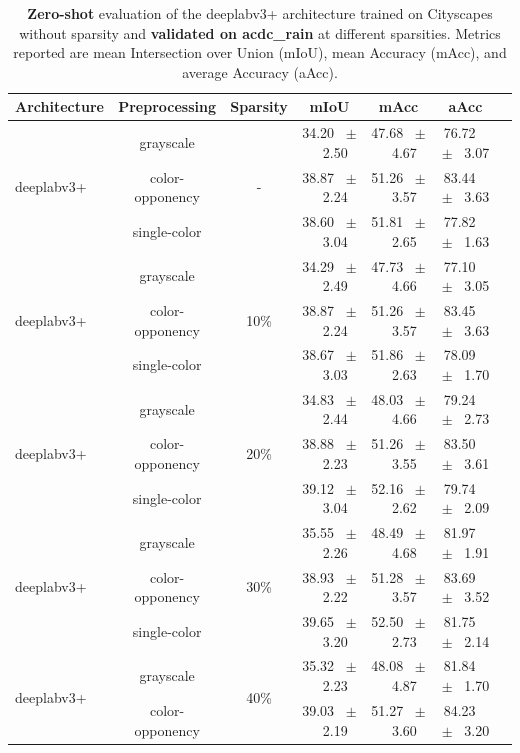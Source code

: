 \begin{table}[h]
  \centering
  \caption{\textbf{Zero-shot} evaluation of the deeplabv3+ architecture trained on Cityscapes without sparsity and \textbf{validated on acdc_rain} at different sparsities. Metrics reported are mean Intersection over Union (mIoU), mean Accuracy (mAcc), and average Accuracy (aAcc).}
  \begin{tabular}{@{}lccc ccc@{}}
    \toprule
    Architecture & Preprocessing & Sparsity & mIoU & mAcc & aAcc \\
    \midrule
    \multirow{3}{*}{deeplabv3+} & grayscale & \multirow{3}{*}{-} & 34.20 ~$\pm$~ 2.50 & 47.68 ~$\pm$~ 4.67 & 76.72 ~$\pm$~ 3.07 \\
    & color-opponency &  & 38.87 ~$\pm$~ 2.24 & 51.26 ~$\pm$~ 3.57 & 83.44 ~$\pm$~ 3.63 \\
    & single-color &  & 38.60 ~$\pm$~ 3.04 & 51.81 ~$\pm$~ 2.65 & 77.82 ~$\pm$~ 1.63 \\
    \midrule
    \multirow{3}{*}{deeplabv3+} & grayscale & \multirow{3}{*}{10\%} & 34.29 ~$\pm$~ 2.49 & 47.73 ~$\pm$~ 4.66 & 77.10 ~$\pm$~ 3.05 \\
    & color-opponency &  & 38.87 ~$\pm$~ 2.24 & 51.26 ~$\pm$~ 3.57 & 83.45 ~$\pm$~ 3.63 \\
    & single-color &  & 38.67 ~$\pm$~ 3.03 & 51.86 ~$\pm$~ 2.63 & 78.09 ~$\pm$~ 1.70 \\
    \midrule
    \multirow{3}{*}{deeplabv3+} & grayscale & \multirow{3}{*}{20\%} & 34.83 ~$\pm$~ 2.44 & 48.03 ~$\pm$~ 4.66 & 79.24 ~$\pm$~ 2.73 \\
    & color-opponency &  & 38.88 ~$\pm$~ 2.23 & 51.26 ~$\pm$~ 3.55 & 83.50 ~$\pm$~ 3.61 \\
    & single-color &  & 39.12 ~$\pm$~ 3.04 & 52.16 ~$\pm$~ 2.62 & 79.74 ~$\pm$~ 2.09 \\
    \midrule
    \multirow{3}{*}{deeplabv3+} & grayscale & \multirow{3}{*}{30\%} & 35.55 ~$\pm$~ 2.26 & 48.49 ~$\pm$~ 4.68 & 81.97 ~$\pm$~ 1.91 \\
    & color-opponency &  & 38.93 ~$\pm$~ 2.22 & 51.28 ~$\pm$~ 3.57 & 83.69 ~$\pm$~ 3.52 \\
    & single-color &  & 39.65 ~$\pm$~ 3.20 & 52.50 ~$\pm$~ 2.73 & 81.75 ~$\pm$~ 2.14 \\
    \midrule
    \multirow{3}{*}{deeplabv3+} & grayscale & \multirow{3}{*}{40\%} & 35.32 ~$\pm$~ 2.23 & 48.08 ~$\pm$~ 4.87 & 81.84 ~$\pm$~ 1.70 \\
    & color-opponency &  & 39.03 ~$\pm$~ 2.19 & 51.27 ~$\pm$~ 3.60 & 84.23 ~$\pm$~ 3.20 \\

\end{tabular}
\end{table}
